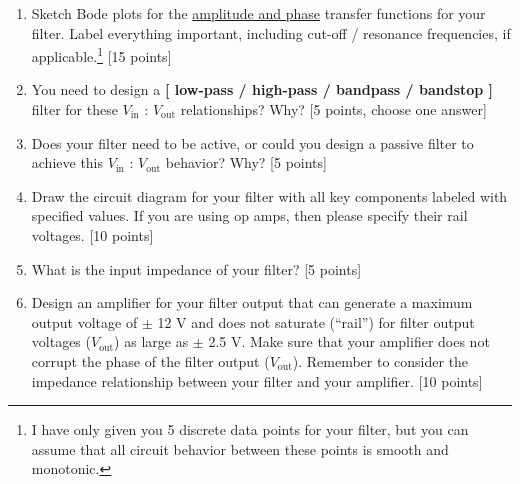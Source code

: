 \begin{enumerate}
	\item Sketch Bode plots for the \underline{amplitude and phase} transfer functions for your filter.  Label everything important, including cut-off / resonance frequencies, if applicable.\footnote{I have only given you 5 discrete data points for your filter, but you can assume that all circuit behavior between these points is smooth and monotonic.} [15 points]
	\item You need to design a {\bf [ low-pass / high-pass / bandpass / bandstop ]} filter for these $V_\textrm{in}$ : $V_\textrm{out}$ relationships? Why? [5 points, choose one answer]
	\item Does your filter need to be active, or could you design a passive filter to achieve this $V_\textrm{in}$ : $V_\textrm{out}$  behavior? Why? [5 points]
	\item Draw the circuit diagram for your filter with all key components labeled with specified values.  If you are using op amps, then please specify their rail voltages. [10 points]
	\item What is the input impedance of your filter? [5 points]
	\item Design an amplifier for your filter output that can generate a maximum output voltage of $\pm$ 12 V and does not saturate (``rail'') for filter output voltages ($V_\textrm{out}$) as large as $\pm$ 2.5 V. Make sure that your amplifier does not corrupt the phase of the filter output ($V_\textrm{out}$).  Remember to consider the impedance relationship between your filter and your amplifier.  [10 points]
\end{enumerate}
